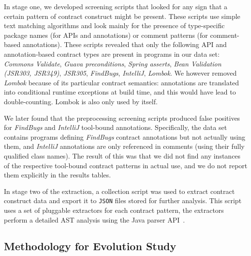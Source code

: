\documentclass[a4paper,UKenglish]{lipics-v2016}
\begin{document}
In stage one, we developed screening scripts that looked for any sign that a certain pattern of contract construct might be present. These scripts use simple text matching algorithms and look mainly for the presence of type-specific package names (for APIs and annotations) or comment patterns (for comment-based annotations). These scripts revealed that only the following API and annotation-based contract types are present in programs in our data set: \textit{Commons Validate}, \textit{Guava preconditions}, \textit{Spring asserts}, \textit{Bean Validation (JSR303, {JSR349})}, \textit{JSR305}, \textit{FindBugs}, \textit{IntelliJ}, \textit{Lombok}. We however removed \textit{Lombok} because of its particular contract semantics: annotations are translated into conditional runtime exceptions at build time, and this would have lead to double-counting. Lombok is also only used by itself.

We later found that the preprocessing screening scripts produced false positives for \textit{FindBugs} and \textit{IntelliJ} tool-bound annotations.  Specifically, the data set contains programs defining \textit{FindBugs} contract annotations but not actually using them, and \textit{IntelliJ} annotations are only referenced in comments (using their fully qualified class names). The result of this was that we did not find any instances of the respective tool-bound contract patterns in actual use, and we do not report them explicitly in the results tables.

In stage two of the extraction, a collection script was used to extract contract construct data and export it to \texttt{JSON} files stored for further analysis. This script uses a set of pluggable extractors for each contract pattern, the extractors perform a detailed AST analysis using the Java parser API~\cite{javaparser}. 


\subsection{Methodology for Evolution Study}
\label{ssec:meth:evolution}
\end{document}
